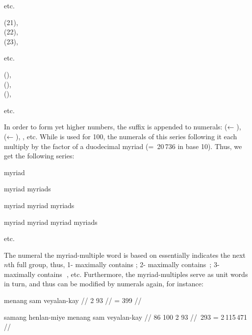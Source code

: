 	etc.

\a %
	 (21), \\
	 (22), \\
	 (23),  \medskip
	
	etc.
	
\a %
	 (), \\
	 (), \\
	 (), \medskip
	
	etc.
\xe

In order to form yet higher numbers, the suffix  is 
appended to numerals:  (← ), 
 (← ), , etc. 
While  is used for 100, the numerals of this series 
following it each multiply by the factor of a duodecimal myriad 
(=~20\,736 in base 10). Thus, we get the following series:

\ex
		\quad myriad
		
		\quad myriad myriads
		
		\quad myriad myriad myriads
		
		\quad myriad myriad myriad myriads \medskip

	etc.
\xe

The numeral the myriad-multiple word is based on essentially indicates the next 
$n$th full group, thus, 1- maximally contains \elv\elv\elv\elv; 
2- maximally contains \elv\elv\elv\elv\,\elv\elv\elv\elv; 3- 
maximally contains \elv\elv\elv\elv\,\elv\elv\elv\elv\,\elv\elv\elv\elv, etc. 
Furthermore, the myriad-multiples serve as unit words in 
turn, and thus can be modified by numerals again, for instance:

\pex
\a\begingl
	\gla menang sam veyalan-kay //
	 {2} {93} //
	 = 399 //
\endgl

\a\begingl
	\gla samang henlan-miye menang sam veyalan-kay //
	 {86} {100} {2} {93} //
	\,293 = 2\,115\,471 //
\endgl

